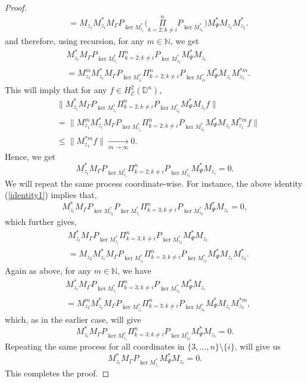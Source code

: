\documentclass[12pt]{amsart}
\theoremstyle{definition}
\newcommand{\Nat}{\mathbb{N}}
\newcommand{\D}{\mathbb{D}}
\newcommand{\1}{{\mbox{\bf 1}}}
\newcommand{\cle}{\mathcal{E}}
\newcommand{\raro}{\rightarrow}
\begin{document}
\begin{proof}
\begin{align*}
&= M_{z_1} M_{z_i}^* M_{\Gamma} P_{\ker M_{z_i}^*} \big( \underset{k=2; k \neq i}{\overset{n}{\Pi}} P_{\ker M_{z_k}^*} \big) M_{\Psi}^* M_{z_i} M_{z_1}^*.
\end{align*}
and therefore, using recursion, for any $m \in \Nat$, we get
\begin{align*}
&M_{z_i}^* M_{\Gamma} P_{\ker M_{z_i}^*}\Pi_{k=2; k \neq i}^n P_{\ker M_{z_k}^*} M_{\Psi}^* M_{z_i} \\
&= M_{z_1}^m M_{z_i}^* M_{\Gamma} P_{\ker M_{z_i}^*}\Pi_{k=2; k \neq i}^n P_{\ker M_{z_k}^*} M_{\Psi}^* M_{z_i} M_{z_1}^{*m}.
\end{align*}
This will imply that for any $f \in H_{\cle}^2(\D^n)$,
\begin{align*}
&\| M_{z_i}^* M_{\Gamma} P_{\ker M_{z_i}^*}\Pi_{k=2; k \neq i}^n P_{\ker M_{z_k}^*} M_{\Psi}^* M_{z_i}  f\| \\
&= \|M_{z_1}^m M_{z_i}^* M_{\Gamma} P_{\ker M_{z_i}^*}\Pi_{k=2; k \neq i}^n P_{\ker M_{z_k}^*} M_{\Psi}^* M_{z_i} M_{z_1}^{*m}f\| \\
& \leq \|M_{z_1}^{*m} f\| \underset{m \raro \infty} \raro 0.
\end{align*}
Hence, we get
\begin{equation}\label{identity1}
M_{z_i}^* M_{\Gamma} P_{\ker M_{z_i}^*}\Pi_{k=2; k \neq i}^n P_{\ker M_{z_k}^*} M_{\Psi}^* M_{z_i} = 0.
\end{equation}
We will repeat the same process coordinate-wise.  For instance, the above identity (\ref{identity1}) implies that,
\[
M_{z_i}^* M_{\Gamma} P_{\ker M_{z_2}^*}P_{\ker M_{z_i}^*}\Pi_{k=3; k \neq i}^n P_{\ker M_{z_k}^*} M_{\Psi}^* M_{z_i}  = 0,
\]
which further gives, 
\begin{align*}
&M_{z_i}^* M_{\Gamma} P_{\ker M_{z_i}^*}\Pi_{k=3; k \neq i}^n P_{\ker M_{z_k}^*} M_{\Psi}^* M_{z_i}  \\
&= 
M_{z_2}M_{z_i}^* M_{\Gamma} P_{\ker M_{z_i}^*}\Pi_{k=3; k \neq i}^n P_{\ker M_{z_k}^*} M_{\Psi}^* M_{z_i}M_{z_2}^*.
\end{align*}
Again as above, for any $m \in \Nat$, we have
\begin{align*}
&M_{z_i}^* M_{\Gamma} P_{\ker M_{z_i}^*}\Pi_{k=3; k \neq i}^n P_{\ker M_{z_k}^*} M_{\Psi}^* M_{z_i} \\
&= 
M_{z_2}^m M_{z_i}^* M_{\Gamma} P_{\ker M_{z_i}^*}\Pi_{k=3; k \neq i}^n P_{\ker M_{z_k}^*} M_{\Psi}^* M_{z_i}M_{z_2}^{*m},
\end{align*}
which, as in the earlier case, will give
\[
M_{z_i}^* M_{\Gamma} P_{\ker M_{z_i}^*}\Pi_{k=3; k \neq i}^n P_{\ker M_{z_k}^*} M_{\Psi}^* M_{z_i}  = 0.
\]
Repeating the same process for all coordinates in $\{3,\ldots,n\} \setminus \{i\}$, will give us
\[
M_{z_i}^* M_{\Gamma} P_{\ker M_{z_i}^*} M_{\Psi}^* M_{z_i}  = 0.
\]
This completes the proof.
\end{proof}
\end{document}
